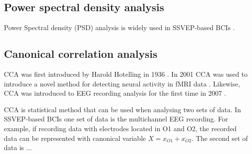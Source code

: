 \subsection{Power spectral density analysis}

Power Spectral density (PSD) analysis is widely used in \gls{SSVEP}-based \glspl{BCI} \cite{bin2009cca}.

\subsection{Canonical correlation analysis}

\Gls{CCA} was first introduced by Harold Hotelling in 1936 \cite{cca_hotelling}. In 2001 \gls{CCA} was used to introduce a novel method for detecting neural activity in \gls{fMRI} data \cite{cca_fmri}. Likewise, \gls{CCA} was introduced to \gls{EEG} recording analysis for the first time in 2007 \cite{cca_eeg_lin}. 

\Gls{CCA} is statistical method that can be used when analysing two sets of data. In \gls{SSVEP}-based \glspl{BCI} one set of data is the multichannel \gls{EEG} recording. For example, if recording data with electrodes located in O1 and O2, the recorded data can be represented with canonical variable $X=x_{O1}+x_{O2}$. The second set of data is ...
